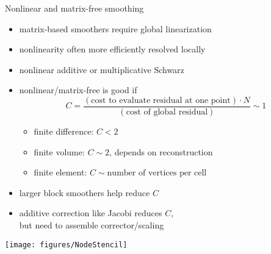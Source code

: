 \begin{frame}{Nonlinear and matrix-free smoothing}
  \begin{itemize}
  \item matrix-based smoothers require global linearization
  \item nonlinearity often more efficiently resolved locally
  \item nonlinear additive or multiplicative Schwarz
  \item nonlinear/matrix-free is good if
    \[ C = \frac{(\text{cost to evaluate residual at one point}) \cdot N}{(\text{cost of global residual})} \sim 1 \]
    \begin{itemize}
    \item finite difference: $C < 2$
    \item finite volume: $C \sim 2$, depends on reconstruction
    \item finite element: $C \sim \text{number of vertices per cell}$
    \end{itemize}
  \item larger block smoothers help reduce $C$
  \item additive correction like Jacobi reduces $C$, \\
    but need to assemble corrector/scaling
  \end{itemize}
  \vspace{-4.5em}
  \hfill \texttt{[image: figures/NodeStencil]}
\end{frame}
